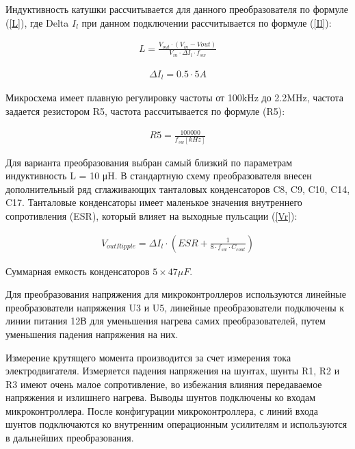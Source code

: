 Индуктивность катушки рассчитывается для данного преобразователя по формуле (\ref{L}), где Delta $I_{l}$ при данном подключении рассчитывается по формуле (\ref{Il}):
\begin{ceqn}
	\begin{align} \label{L}
		L = \frac{V_{out}\cdot(V_{in}-V{out})}{V_{in}\cdot\Delta  I_l\cdot f_{sw}}
	\end{align}
\end{ceqn}

\begin{ceqn}
	\begin{align} \label{Il}
		\Delta I_l = 0.5 \cdot 5A
	\end{align}
\end{ceqn}

Микросхема имеет плавную регулировку частоты от 100kHz до 2.2MHz, частота задается резистором R5, частота рассчитывается по формуле (R5):
\begin{ceqn}
	\begin{align} \label{R5}
		R5 = \frac{100000}{f_{sw}[kHz]}
	\end{align}
\end{ceqn}

Для варианта преобразования выбран самый близкий по параметрам индуктивность L = 10 μH. В стандартную схему преобразователя внесен дополнительный ряд сглаживающих танталовых конденсаторов C8, C9, C10, C14, C17. Танталовые конденсаторы имеет маленькое значения внутреннего сопротивления (ESR), который влияет на выходные пульсации (\ref{Vr}):

\begin{ceqn}
	\begin{align} \label{Vr}
		V_{outRipple} = \Delta I_l \cdot (ESR + \frac{1}{8\cdot f_{sw} \cdot C_{cout}})
	\end{align}
\end{ceqn}

Суммарная емкость конденсаторов $5 \times  47\mu F$.

Для преобразования напряжения для микроконтроллеров используются линейные преобразователи напряжения U3 и U5, линейные преобразователи подключены к линии питания 12В для уменьшения   нагрева самих преобразователей, путем уменьшения падения напряжения на них.

Измерение крутящего момента производится за счет измерения тока электродвигателя. Измеряется падения напряжения на шунтах, шунты R1, R2 и R3 имеют очень малое сопротивление, во избежания влияния передаваемое напряжения и излишнего  нагрева. Выводы шунтов подключены ко входам микроконтроллера. После конфигурации микроконтроллера, с линий входа шунтов подключаются ко внутренним операционным усилителям и используются в дальнейших преобразования.

